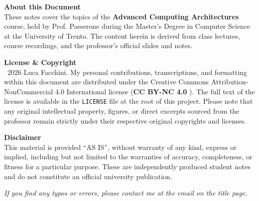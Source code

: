 \newpage
\thispagestyle{empty}
\vspace*{\fill}

\noindent \textbf{About this Document}\\
These notes cover the topics of the \textbf{Advanced Computing Architectures} course, held by Prof. Passerone during the Master's Degree in Computer Science at the University of Trento. The content herein is derived from class lectures, course recordings, and the professor's official slides and notes.

\vspace{1em}
\noindent \textbf{License \& Copyright}\\
\textcopyright\ 2026 Luca Facchini. My personal contributions, transcriptions, and formatting within this document are distributed under the Creative Commons Attribution-NonCommercial 4.0 International license (\textbf{CC BY-NC 4.0} \ccbynceu). The full text of the license is available in the \texttt{LICENSE} file at the root of this project. Please note that any original intellectual property, figures, or direct excerpts sourced from the professor remain strictly under their respective original copyrights and licenses.

\vspace{1em}
\noindent \textbf{Disclaimer}\\
This material is provided ``AS IS'', without warranty of any kind, express or implied, including but not limited to the warranties of accuracy, completeness, or fitness for a particular purpose. These are independently produced student notes and do not constitute an official university publication. 

\vspace{1em}
\noindent \textit{If you find any typos or errors, please contact me at the email on the title page.}
\vspace{2cm}
